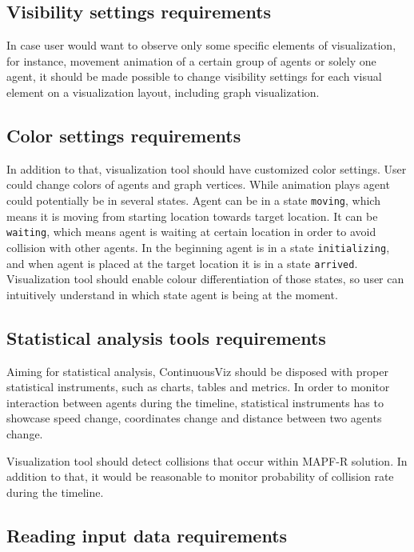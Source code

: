 \documentclass[thesis=B,english]{FITthesis}[2019/12/23]
\begin{document}
\subsection{Visibility settings requirements}

In case user would want to observe only some specific elements of visualization, for instance, movement animation of a certain group of agents or solely one agent, it should be made possible to change visibility settings for each visual element on a visualization layout, including graph visualization.

\subsection{Color settings requirements}

In addition to that, visualization tool should have customized color settings. User could change colors of agents and graph vertices. While animation plays agent could potentially be in several states. Agent can be in a state \verb|moving|, which means it is moving from starting location towards target location. It can be \verb|waiting|, which means agent is waiting at certain location in order to avoid collision with other agents. In the beginning agent is in a state \verb|initializing|, and when agent is placed at the target location it is in a state \verb|arrived|. Visualization tool should enable colour differentiation of those states, so user can intuitively understand in which state agent is being at the moment.

\subsection{Statistical analysis tools requirements}

Aiming for statistical analysis, ContinuousViz should be disposed with proper statistical instruments, such as charts, tables and metrics. In order to monitor interaction between agents during the timeline, statistical instruments has to showcase speed change, coordinates change and distance between two agents change.


Visualization tool should detect collisions that occur within MAPF-R solution. In addition to that, it would be reasonable to monitor probability of collision rate during the timeline.

\subsection{Reading input data requirements}
\end{document}
